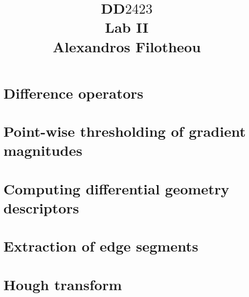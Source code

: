 \documentclass[oneside,12pt]{article}
\title{DD$2423$ \\ Lab II \\ Alexandros Filotheou}
\date{}
\begin{document}
	\maketitle

	\section{Difference operators}
		
		\newpage

	\section{Point-wise thresholding of gradient magnitudes}
		
		\newpage

	\section{Computing differential geometry descriptors}
		
		\newpage

	\section{Extraction of edge segments}
		
		\newpage

  \section{Hough transform}
    
\end{document}
